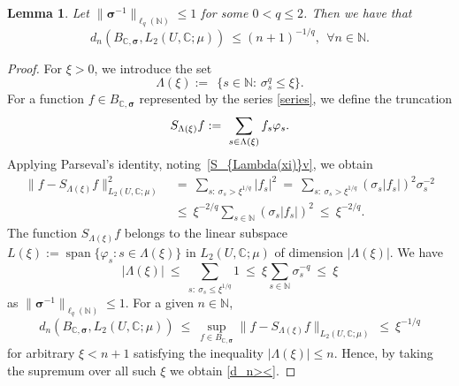 \documentclass[10pt,a4paper]{amsart}
\newtheorem{lemma}{Lemma}
\def\CC{{\mathbb C}}
\def\NN{{\mathbb N}}
\newcommand{\bsigma}{{\boldsymbol{\sigma}}}
\begin{document}
\begin{lemma} \label{lemma:d_n><}
Let $\|\bsigma^{-1}\|_{\ell_q(\NN)} \le 1$ for some $0 < q \le 2$.	Then we have that
	\begin{equation} \label{d_n><}
		d_n(B_{\CC,\bsigma},L_2(U,\CC;\mu))
        \ \le (n+1)^{-1/q}, \ \ \forall n \in \NN.
	\end{equation}
\end{lemma}	

\begin{proof}	
	For $\xi>0$, we introduce the set 	
	\begin{equation*} \label{Lambda_sigma(xi)}
\Lambda(\xi)
	:= \ 
	\ \big\{s \in \NN: \, \sigma_s^{q} \le \xi \big\}.
\end{equation*}
 For a function $f \in B_{\CC,\bsigma}$
	represented by the series \eqref{series}, we define the truncation 
	\begin{equation} \label{S_{Lambda(xi)}v}
		S_{\Lambda(\xi)} f 
		:= \ 
		\sum_{s\in {\Lambda(\xi)}} f_s \varphi_s.
	\end{equation}	
	Applying Parseval's identity, 
	noting~\eqref{S_{Lambda(xi)}v}, we obtain 
		\begin{equation} \nonumber
		\begin{split}
			\|f- S_{\Lambda(\xi)}f\|_{L_2(U,\CC;\mu)}^2 
			\ & {=} \
            \sum_{s: \ \sigma_{s}> \xi^{1/q} } |f_s|^2 
			\ = \
            \sum_{s: \ \sigma_{s}> \xi^{1/q} } (\sigma_{s}|f_s|)^2 \sigma_{s}^{-2}
			\\[1.5ex]
			\ &\le \
			\xi^{-2/q}
			\sum_{s \in \NN} (\sigma_{s}|f_s|)^2 
			\ \le \ \xi^{-2/q}.
		\end{split}
	\end{equation} 
The function $S_{\Lambda(\xi)}f$ belongs to the linear subspace 
$L(\xi):= \operatorname{span}\{\varphi_s: s \in \Lambda(\xi)\}$ in $L_2(U,\CC;\mu)$ of dimension $|\Lambda(\xi)|$. We have
\begin{equation} \nonumber
	|\Lambda(\xi)|
	\ \le \ 
    \sum_{s: \ \sigma_{s}\le \xi^{1/q} } 1
	\ \le \ 
	\xi \sum_{s \in \NN} \sigma_s^{-q} 
	\ \le \ \xi
\end{equation}
as $\|\bsigma^{-1}\|_{\ell_q(\NN)} \le 1$. 
For a given $n \in \NN$, 
	\begin{equation} \nonumber
			d_n(B_{\CC,\bsigma},L_2(U,\CC;\mu))
			\ \le \
        \sup_{f\in B_{\CC,\bsigma}}\|f- S_{\Lambda(\xi)}f\|_{L_2(U,\CC;\mu)} 
		\ \le \
		\xi^{-1/q}
\end{equation} 
for arbitrary  $\xi < n+1$ satisfying the inequality 
$|\Lambda(\xi)|\le n$.  Hence, by taking the supremum over all such $\xi$ we obtain \eqref{d_n><}.
	\hfill
\end{proof}
\end{document}

